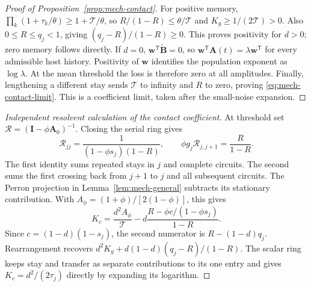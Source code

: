 \begin{proof}[Proof of Proposition~\ref{prop:mech-contact}]
For positive memory, \(\prod_k(1+\tau_k/\theta)\geq1+\mathcal T/\theta\), so \(R/(1-R)\leq\theta/\mathcal T\) and \(K_g\geq1/(2\mathcal T)>0\). Also \(0\leq R\leq q_j<1\), giving \((q_j-R)/(1-R)\geq0\). This proves positivity for \(d>0\); zero memory follows directly. If \(d=0\), \(\mathbf w^{\mathsf T}\widetilde{\mathbf B}=0\), so \(\mathbf w^{\mathsf T}\mathbf A(t)=\lambda\mathbf w^{\mathsf T}\) for every admissible host history. Positivity of \(\mathbf w\) identifies the population exponent as \(\log\lambda\). At the mean threshold the loss is therefore zero at all amplitudes. Finally, lengthening a different stay sends \(\mathcal T\) to infinity and \(R\) to zero, proving \eqref{eq:mech-contact-limit}. This is a coefficient limit, taken after the small-noise expansion.
\end{proof}

\begin{proof}[Independent resolvent calculation of the contact coefficient]
At threshold set \(\mathcal R=(\mathbf I-\phi\mathbf A_0)^{-1}\). Closing the serial ring gives
\[
 \mathcal R_{jj}=\frac1{(1-\phi s_j)(1-R)},\qquad
 \phi g_j\mathcal R_{j,j+1}=\frac R{1-R}.
\]
The first identity sums repeated stays in \(j\) and complete circuits. The second sums the first crossing back from \(j+1\) to \(j\) and all subsequent circuits. The Perron projection in Lemma~\ref{lem:mech-general} subtracts its stationary contribution. With \(A_\phi=(1+\phi)/[2(1-\phi)]\), this gives
\[
 K_c=\frac{d^2A_\phi}{\mathcal T}
 -d\frac{R-\phi c/(1-\phi s_j)}{1-R}.
\]
Since \(c=(1-d)(1-s_j)\), the second numerator is \(R-(1-d)q_j\). Rearrangement recovers \(d^2K_g+d(1-d)(q_j-R)/(1-R)\). The scalar ring keeps stay and transfer as separate contributions to its one entry and gives \(K_c=d^2/(2\tau_j)\) directly by expanding its logarithm.
\end{proof}

